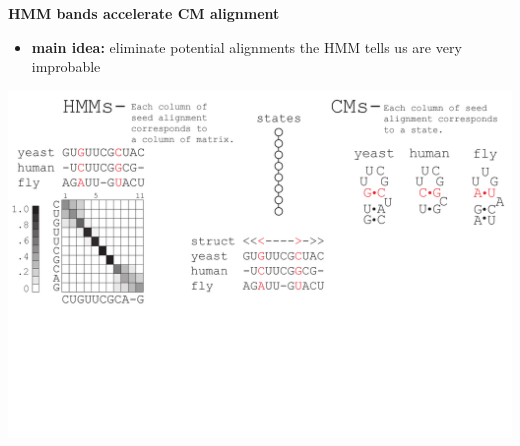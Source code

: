 \documentclass[landscape]{slides}
\begin{document}
\begin{slide}
\begin{center}

\textbf{HMM bands accelerate CM alignment}
\end{center}
\medskip
\small
\begin{itemize}
\item
\textbf{main idea:} eliminate potential alignments the HMM tells us are very improbable
\end{itemize}
\begin{center}
\includegraphics[width=8in]{figs/post_hmm_to_cm_map2_layer2}
\end{center}
\vfill
\end{slide}
\end{document}
